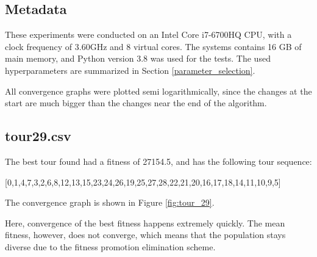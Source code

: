 \documentclass[a4paper,10pt]{article}
\newcommand{\ReplaceMe}[1]{{\color{blue}#1}}
\begin{document}
\subsection{Metadata}


These experiments were conducted on an Intel Core i7-6700HQ CPU, with a clock frequency of 3.60GHz and 8 virtual cores. The systems contains 16 GB of main memory, and Python version 3.8 was used for the tests. The used hyperparameters are summarized in Section \ref{parameter_selection}.

All convergence graphs were plotted semi logarithmically, since the changes at the start are much bigger than the changes near the end of the algorithm.

\subsection{tour29.csv}


The best tour found had a fitness of 27154.5, and has the following tour sequence: 

[0,1,4,7,3,2,6,8,12,13,15,23,24,26,19,25,27,28,22,21,20,16,17,18,14,11,10,9,5]

The convergence graph is shown in Figure \ref{fig:tour_29}.

Here, convergence of the best fitness happens extremely quickly. The mean fitness, however, does not converge, which means that the population stays diverse due to the fitness promotion elimination scheme. 
\end{document}
